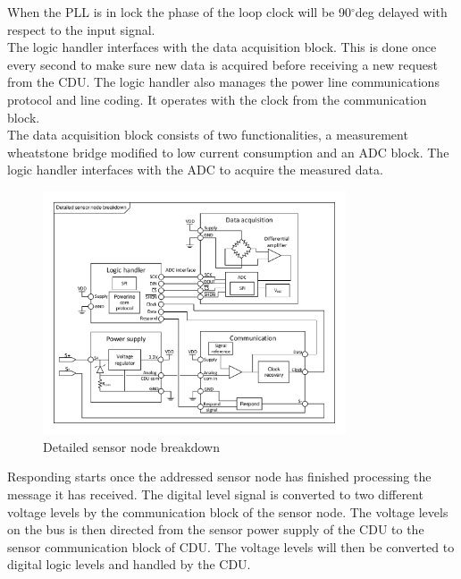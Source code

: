 When the PLL is in lock the phase of the loop clock will be 90$^{\circ}$deg delayed with respect to the input signal.\\
The logic handler interfaces with the data acquisition block. This is done once every second to make sure new data is acquired before receiving a new request from the CDU. The logic handler also manages the power line communications protocol and line coding. It operates with the clock from the communication block.\\
The data acquisition block consists of two functionalities, a measurement wheatstone bridge modified to low current consumption and an ADC block. The logic handler interfaces with the ADC to acquire the measured data.
\begin{figure}[H]
	\centering
	\includegraphics[width=0.8\textwidth]{billeder/11ProjectDescription/SN_detailed_design}
	\caption{Detailed sensor node breakdown}
	\label{fig:SN_detailed}
\end{figure}
Responding starts once the addressed sensor node has finished processing the message it has received. The digital level signal is converted to two different voltage levels by the communication block of the sensor node. The voltage levels on the bus is then directed from the sensor power supply of the CDU to the sensor communication block of CDU. The voltage levels will then be converted to digital logic levels and handled by the CDU.

